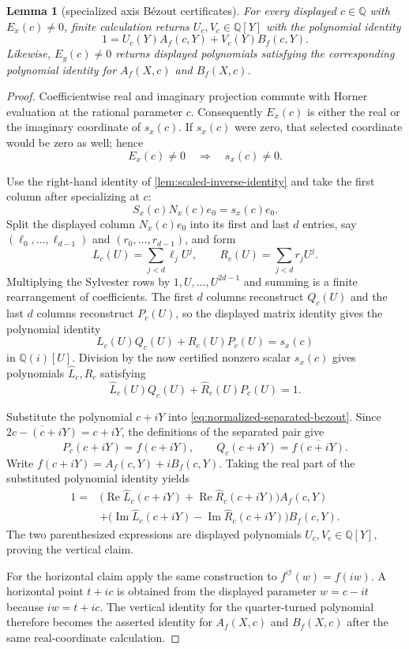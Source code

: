 \documentclass[11pt]{article}
\newtheorem{lemma}[theorem]{Lemma}
\newcommand{\Qi}{\mathbb{Q}(i)}
\newcommand{\Q}{\mathbb{Q}}
\newcommand{\Ree}{\operatorname{Re}}
\newcommand{\Imm}{\operatorname{Im}}
\begin{document}
\begin{lemma}[specialized axis B\'ezout certificates]
\label{lem:axis-bezout}
For every displayed $c\in\Q$ with $E_x(c)\ne0$, finite calculation returns
$U_c,V_c\in\Q[Y]$ with the polynomial identity
\[
             1=U_c(Y)A_f(c,Y)+V_c(Y)B_f(c,Y).
\]
Likewise, $E_y(c)\ne0$ returns displayed polynomials satisfying the
corresponding polynomial identity for $A_f(X,c)$ and $B_f(X,c)$.
\end{lemma}

\begin{proof}
Coefficientwise real and imaginary projection commute with Horner
evaluation at the rational parameter $c$.  Consequently $E_x(c)$ is either
the real or the imaginary coordinate of $s_x(c)$.  If $s_x(c)$ were zero,
that selected coordinate would be zero as well; hence
\[
                    E_x(c)\ne0\quad\Longrightarrow\quad s_x(c)\ne0.
\]

Use the right-hand identity of \cref{lem:scaled-inverse-identity} and take
the first column after specializing at $c$:
\[
             S_x(c)N_x(c)e_0=s_x(c)e_0.
\]
Split the displayed column $N_x(c)e_0$ into its first and last $d$
entries, say $(\ell_0,\ldots,\ell_{d-1})$ and
$(r_0,\ldots,r_{d-1})$, and form
\[
       L_c(U)=\sum_{j<d}\ell_jU^j,
       \qquad R_c(U)=\sum_{j<d}r_jU^j.
\]
Multiplying the Sylvester rows by $1,U,\ldots,U^{2d-1}$ and summing is a
finite rearrangement of coefficients.  The first $d$ columns reconstruct
$Q_c(U)$ and the last $d$ columns reconstruct $P_c(U)$, so the displayed
matrix identity gives the polynomial identity
\[
              L_c(U)Q_c(U)+R_c(U)P_c(U)=s_x(c)
\]
in $\Qi[U]$.  Division by the now certified nonzero scalar
$s_x(c)$ gives polynomials $\widehat L_c,\widehat R_c$ satisfying
\begin{equation}
\label{eq:normalized-separated-bezout}
              \widehat L_c(U)Q_c(U)+
              \widehat R_c(U)P_c(U)=1.
\end{equation}

Substitute the polynomial $c+iY$ into
\eqref{eq:normalized-separated-bezout}.  Since
$\overline{2c-(c+iY)}=c+iY$, the definitions of the separated pair give
\[
 P_c(c+iY)=f(c+iY),
 \qquad
 Q_c(c+iY)=\overline{f(c+iY)}.
\]
Write $f(c+iY)=A_f(c,Y)+iB_f(c,Y)$.  Taking the real part of the substituted
polynomial identity yields
\[
\begin{aligned}
1={}&\bigl(\Ree\widehat L_c(c+iY)+\Ree\widehat R_c(c+iY)\bigr)A_f(c,Y)\\
 &+\bigl(\Imm\widehat L_c(c+iY)-\Imm\widehat R_c(c+iY)\bigr)B_f(c,Y).
\end{aligned}
\]
The two parenthesized expressions are displayed polynomials
$U_c,V_c\in\Q[Y]$, proving the vertical claim.

For the horizontal claim apply the same construction to
$f^{\circlearrowleft}(w)=f(iw)$.  A horizontal point $t+ic$ is obtained from
the displayed parameter $w=c-it$ because $iw=t+ic$.  The vertical identity
for the quarter-turned polynomial therefore becomes the asserted identity
for $A_f(X,c)$ and $B_f(X,c)$ after the same real-coordinate calculation.
\end{proof}
\end{document}
